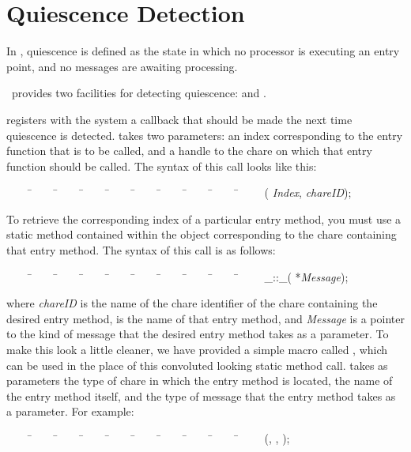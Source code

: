 \section{Quiescence Detection}

In \charmpp, quiescence is defined as the state in which no
processor is executing an entry point, and no messages are awaiting processing.

\charmpp\ provides two facilities for detecting quiescence:  and
.

 registers with the system a callback that should be made the
next time quiescence is detected.   takes two
parameters: an index corresponding to the entry function that is to be called,
and a handle to the chare on which that entry function should be called.  The
syntax of this call looks like this:

\begin{tabbing}
~~~~ \=~~~~ \=~~~~ \=~~~~ \=~~~~ \=~~~~ \=~~~~ \=~~~~ \=~~~~ \=~~~~ \kill
\> ( {\it Index},  {\it chareID});
\end{tabbing}

To retrieve the corresponding index of a particular entry
method, you must use a static method contained within the
 object corresponding to the chare
containing that entry method.  The syntax of this call is as follows:

\begin{tabbing}
~~~~ \=~~~~ \=~~~~ \=~~~~ \=~~~~ \=~~~~ \=~~~~ \=~~~~ \=~~~~ \=~~~~ \kill
{}\_::\_(
*{\it Message});
\end{tabbing}

where {\it chareID} is the name of the chare identifier of the chare containing
the desired entry method,  is the name of that entry method,
and {\it Message} is a pointer to the kind of message that the desired entry
method takes as a parameter. To make this look a little cleaner, we have
provided a simple macro called , which can be used in the place
of this convoluted looking static method call.
 takes as parameters the type of chare in
which the entry method is located, the name of the entry method itself, and the
type of message that the entry method takes as a parameter. For example:

\begin{tabbing}
~~~~ \=~~~~ \=~~~~ \=~~~~ \=~~~~ \=~~~~ \=~~~~ \=~~~~ \=~~~~ \=~~~~ \kill
\> (, , );
\end{tabbing}


